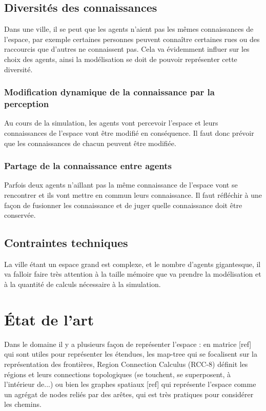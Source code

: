 \documentclass[a4paper]{article}
\begin{document}
\subsection{Diversités des connaissances}

Dans une ville, il se peut que les agents n'aient pas les mêmes connaissances
de l'espace, par exemple certaines personnes peuvent connaître certaines rues
ou des raccourcis que d'autres ne connaissent pas. Cela va évidemment influer
sur les choix des agents, ainsi la modélisation se doit de pouvoir représenter
cette diversité.

  \subsubsection{Modification dynamique de la connaissance par la perception}

  Au cours de la simulation, les agents vont percevoir l'espace et leurs
  connaissances de l'espace vont être modifié en conséquence. Il faut donc
  prévoir que les connaissances de chacun peuvent être modifiée.

  \subsubsection{Partage de la connaissance entre agents}

  Parfois deux agents n'aillant pas la même connaissance de l'espace vont se
  rencontrer et ils vont mettre en commun leurs connaissance. Il faut réfléchir
  à une façon de fusionner les connaissance et de juger quelle connaissance
  doit être conservée.

\subsection{Contraintes techniques}

La ville étant un espace grand est complexe, et le nombre d'agents gigantesque,
il va falloir faire très attention à la taille mémoire que va prendre la
modélisation et à la quantité de calculs nécessaire à la simulation.

\section{État de l'art}

Dans le domaine il y a plusieurs façon de représenter l'espace : en  matrice
[ref] qui sont utiles pour représenter les étendues, les map-tree
\cite{worboys2012} qui se focalisent sur la représentation des frontières,
Region Connection Calculus (RCC-8) \cite{randell1992} définit les régions et leurs
connections topologiques (se touchent, se superposent, à l'intérieur de...) ou
bien les graphes spatiaux [ref] qui représente l'espace comme un agrégat de
nodes reliés par des arêtes, qui est très pratiques pour considérer les
chemins.
\end{document}
